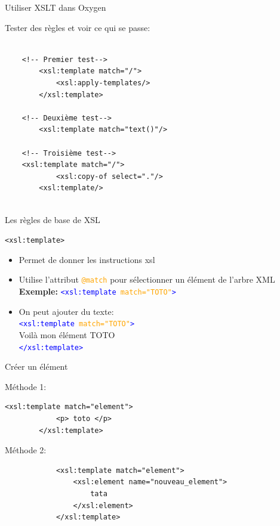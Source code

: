 \begin{frame}[fragile]{Utiliser XSLT dans Oxygen}
    \begin{block}{Tester des règles et voir ce qui se passe:}
\begin{lstlisting}[numbers=none]

    <!-- Premier test-->
        <xsl:template match="/">
            <xsl:apply-templates/>
        </xsl:template>
        
    <!-- Deuxième test-->
        <xsl:template match="text()"/>

    <!-- Troisième test-->
    <xsl:template match="/">
            <xsl:copy-of select="."/>
        <xsl:template/>
        
    \end{lstlisting}


\end{block}
\end{frame}

\begin{frame}[fragile]{Les règles de base de XSL}
    \begin{block}{\texttt{<xsl:template>}}
    \begin{itemize}
        \item Permet de donner les instructions xsl
        \item Utilise l'attribut \textcolor{orange}{\texttt{@match}} pour sélectionner un élément de l’arbre XML\\
        \textbf{Exemple:} \texttt{\textcolor{blue}{<xsl:template} \textcolor{orange}{match="TOTO"}\textcolor{blue}{>}}
        \item On peut ajouter du texte:\\
            \textcolor{blue}{\texttt{<xsl:template \textcolor{orange}{match="TOTO"}>}}\\
               \hspace{1cm} Voilà mon élément TOTO\\
            \textcolor{blue}{\texttt{</xsl:template>}}
    \end{itemize}
    \end{block}
    
\end{frame}

\begin{frame}[fragile]{Créer un élément}
    \begin{block}{Méthode 1:}
    \begin{lstlisting}[numbers=none]
        <xsl:template match="element">
            <p> toto </p>
        </xsl:template>
    \end{lstlisting}
    \end{block}
    
    \begin{block}{Méthode 2:}
        \begin{lstlisting}
            <xsl:template match="element">
                <xsl:element name="nouveau_element">
                    tata
                </xsl:element>
            </xsl:template>
        \end{lstlisting}
    \end{block}
    
\end{frame}

